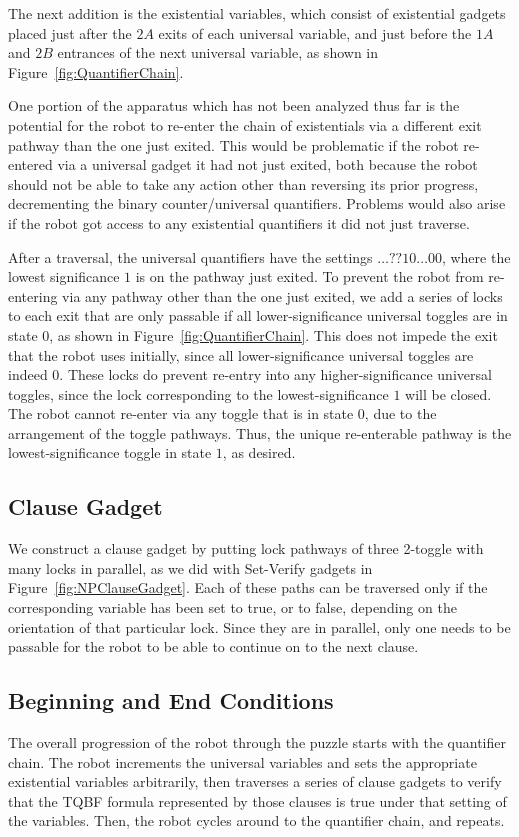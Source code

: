 The next addition is the existential variables, which consist of existential gadgets placed just after the $2A$
exits of each universal variable,
and just before the $1A$ and $2B$ entrances of the next universal variable, as shown
in Figure~\ref{fig:QuantifierChain}.

One portion of the apparatus which has not been analyzed thus far is the potential for the robot to re-enter the chain of existentials
via a different exit pathway than the one just exited. This would be problematic if the robot re-entered via a universal gadget it had not just exited,
both because the robot should not be able to take any action other than reversing its prior progress, 
decrementing the binary counter/universal quantifiers. Problems would also arise if the robot got access to any existential quantifiers 
it did not just traverse.

After a traversal, the universal quantifiers have the settings $\ldots??10\ldots00$, where the lowest significance $1$ is 
on the pathway just exited.
To prevent the robot from re-entering via any pathway other than the one just exited, we add a series of locks to each exit that are only passable
if all lower-significance universal toggles are in state $0$, as shown in Figure~\ref{fig:QuantifierChain}.
This does not impede the exit that the robot uses initially, since all
lower-significance universal toggles are indeed $0$. These locks do prevent re-entry into any higher-significance universal toggles, since the
lock corresponding to the lowest-significance $1$ will be closed. The robot cannot re-enter via any toggle that is in state $0$,
due to the arrangement of the toggle pathways. Thus, the unique re-enterable pathway is the lowest-significance toggle in state $1$, as desired.

\subsection{Clause Gadget}
We construct a clause gadget by putting lock pathways of three 2-toggle with many locks in parallel, as we did with Set-Verify gadgets in Figure~\ref{fig:NPClauseGadget}. Each of these paths can be traversed only if the corresponding variable has been set to true, or to false, depending on the orientation of that particular lock. Since they are in parallel, only one needs to be passable for the robot to be able to continue on to the next clause.

\subsection{Beginning and End Conditions}
The overall progression of the robot through the puzzle starts with the quantifier chain.
The robot increments the universal variables and sets the appropriate existential variables arbitrarily, 
then traverses a series of clause gadgets to verify that the TQBF formula represented by those clauses 
is true under that setting of the variables. Then, the robot cycles around to the quantifier chain, and repeats.

